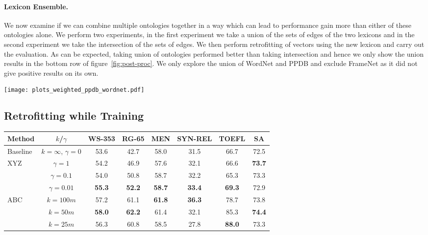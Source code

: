 \documentclass[11pt]{article}
\begin{document}
\paragraph{Lexicon Ensemble.} We now examine if we can combine multiple ontologies
together in a way which can lead to performance gain more than either of these ontologies alone.
We perform two experiments, in the first experiment we take a union of the sets of edges 
of the two lexicons and in the second experiment we take the intersection of the
sets of edges.
We then perform retrofitting of vectors using the new lexicon and carry out the evaluation.
As can be expected, taking union of ontologies performed better than taking 
intersection and hence we only show the union results in the bottom 
row of figure~\ref{fig:post-proc}. We only explore the union of WordNet and 
PPDB and exclude FrameNet as it did not give positive results on its own.

\begin{figure*}[!tb]
  \centering
  \texttt{[image: plots\_weighted\_ppdb\_wordnet.pdf]}
  \caption{Absolute improvement in the Spearman's correlation ratio (3 left columns) and accuracy (3 right 
  columns) using different semantic lexicons.}
  \label{fig:post-proc}
\end{figure*}

\subsection{Retrofitting while Training}
\label{sec:improve-tr}

\begin{table*}[!tbh]
  \centering
  \small
  \begin{tabular}{l|c||c|c|c||c|c||c}
Method & $k$/$\gamma$ & WS-353 & RG-65 & MEN & SYN-REL & TOEFL & SA \\
\hline
Baseline & $k=\infty$, $\gamma=0$ & 53.6 & 42.7 & 58.0 & 31.5 & 66.7 & 72.5 \\
\hline
\multirow{3}{*}{XYZ} & $\gamma=1$ & 54.2 & 46.9 & 57.6 & 32.1 & 66.6 & \textbf{73.7}\\
 & $\gamma=0.1$ & 54.0 & 50.8 & 58.7 & 32.2 & 65.3 & 73.3\\
 & $\gamma=0.01$ & \textbf{55.3} & \textbf{52.2} & \textbf{58.7} & \textbf{33.4} & \textbf{69.3} & 72.9\\
\hline\hline
\multirow{3}{*}{ABC} & $k=100m$ & 57.2 & 61.1 & \textbf{61.8} & \textbf{36.3} & 78.7 & 73.8\\
 & $k=50m$ & \textbf{58.0} & \textbf{62.2} & 61.4 & 32.1 & 85.3 & \textbf{74.4} \\
 & $k=25m$ & 56.3 & 60.8 & 58.5 & 27.8 & \textbf{88.0} & 73.3\\
\end{tabular}
   \caption{%
   Spearman's correlation (3 left columns) and accuracy (3 right columns) on different tasks. Bold indicates 
   best result across all vector types.}
  \label{tab:lbl-tr}
\end{table*}
\end{document}
